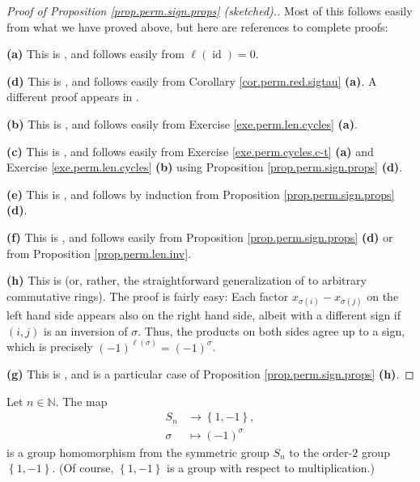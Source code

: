 \begin{proof}
[Proof of Proposition \ref{prop.perm.sign.props} (sketched).]Most of this
follows easily from what we have proved above, but here are references to
complete proofs: \medskip

\textbf{(a)} This is \cite[Proposition 5.15 \textbf{(a)}]{detnotes}, and
follows easily from $\ell\left(  \operatorname*{id}\right)  =0$. \medskip

\textbf{(d)} This is \cite[Proposition 5.15 \textbf{(c)}]{detnotes}, and
follows easily from Corollary \ref{cor.perm.red.sigtau} \textbf{(a)}. A
different proof appears in \cite[Proposition B.13]{Strick13}. \medskip

\textbf{(b)} This is \cite[Exercise 5.10 \textbf{(b)}]{detnotes}, and follows
easily from Exercise \ref{exe.perm.len.cycles} \textbf{(a)}. \medskip

\textbf{(c)} This is \cite[Exercise 5.17 \textbf{(d)}]{detnotes}, and follows
easily from Exercise \ref{exe.perm.cycles.c-t} \textbf{(a)} and Exercise
\ref{exe.perm.len.cycles} \textbf{(b)} using Proposition
\ref{prop.perm.sign.props} \textbf{(d)}. \medskip

\textbf{(e)} This is \cite[Proposition 5.28]{detnotes}, and follows by
induction from Proposition \ref{prop.perm.sign.props} \textbf{(d)}. \medskip

\textbf{(f)} This is \cite[Proposition 5.15 \textbf{(d)}]{detnotes}, and
follows easily from Proposition \ref{prop.perm.sign.props} \textbf{(d)} or
from Proposition \ref{prop.perm.len.inv}. \medskip

\textbf{(h)} This is \cite[Exercise 5.13 \textbf{(a)}]{detnotes} (or, rather,
the straightforward generalization of \cite[Exercise 5.13 \textbf{(a)}%
]{detnotes} to arbitrary commutative rings). The proof is fairly easy: Each
factor $x_{\sigma\left(  i\right)  }-x_{\sigma\left(  j\right)  }$ on the left
hand side appears also on the right hand side, albeit with a different sign if
$\left(  i,j\right)  $ is an inversion of $\sigma$. Thus, the products on both
sides agree up to a sign, which is precisely $\left(  -1\right)  ^{\ell\left(
\sigma\right)  }=\left(  -1\right)  ^{\sigma}$. \medskip

\textbf{(g)} This is \cite[Exercise 5.13 \textbf{(c)}]{detnotes}, and is a
particular case of Proposition \ref{prop.perm.sign.props} \textbf{(h)}.
\end{proof}

\begin{corollary}
\label{cor.perm.sign.hom}Let $n\in\mathbb{N}$. The map%
\begin{align*}
S_{n}  &  \rightarrow\left\{  1,-1\right\}  ,\\
\sigma &  \mapsto\left(  -1\right)  ^{\sigma}%
\end{align*}
is a group homomorphism from the symmetric group $S_{n}$ to the order-$2$
group $\left\{  1,-1\right\}  $. (Of course, $\left\{  1,-1\right\}  $ is a
group with respect to multiplication.)
\end{corollary}

